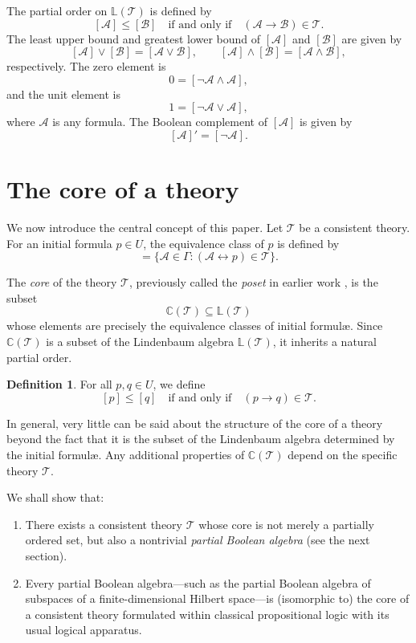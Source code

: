 \documentclass{article}   	%
\theoremstyle{plain}
\theoremstyle{definition}
\newtheorem{definition}[theorem]{Definition}
\theoremstyle{remark}
\begin{document}
The partial order on $\mathbb{L}(\mathcal T)$ is defined by
\[
[\mathcal A] \leq [\mathcal B] \quad \text{if and only if} \quad (\mathcal A \to \mathcal B) \in \mathcal T.
\]
The least upper bound and greatest lower bound of $[\mathcal A]$ and $[\mathcal B]$ are given by
\[
[\mathcal A] \vee [\mathcal B] = [\mathcal A \vee \mathcal B],
\qquad
[\mathcal A] \wedge [\mathcal B] = [\mathcal A \wedge \mathcal B],
\]
respectively.
The zero element is
\[
0 = [\neg \mathcal A \wedge \mathcal A],
\]
and the unit element is
\[
1 = [\neg \mathcal A \vee \mathcal A],
\]
where $\mathcal A$ is any formula.
The Boolean complement of $[\mathcal A]$ is given by
\[
[\mathcal A]' = [\neg \mathcal A].
\]
\section{The core of a theory}
\label{sec:core}

We now introduce the central concept of this paper.
Let $\mathcal T$ be a consistent theory.
For an initial formula $p \in U$, the equivalence class of $p$ is defined by
\begin{equation}
[p] = \{ \mathcal A \in \Gamma : (\mathcal A \leftrightarrow p) \in \mathcal T \}.
\label{eq:core-class}
\end{equation}

The \emph{core} of the theory $\mathcal T$, previously called the \emph{poset} in earlier work \cite{malhas1992quantum}, is the subset
\[
\mathbb C(\mathcal T) \subseteq \mathbb L(\mathcal T)
\]
whose elements are precisely the equivalence classes of initial formul\ae.
Since $\mathbb C(\mathcal T)$ is a subset of the Lindenbaum algebra $\mathbb L(\mathcal T)$, it inherits a natural partial order.

\begin{definition}
\label{def:core-order}
For all $p,q \in U$, we define
\[
[p] \le [q] \quad \text{if and only if} \quad (p \to q) \in \mathcal T.
\]
\end{definition}

In general, very little can be said about the structure of the core of a theory beyond the fact that it is the subset of the Lindenbaum algebra determined by the initial formul\ae.
Any additional properties of $\mathbb C(\mathcal T)$ depend on the specific theory $\mathcal T$.

We shall show that:
\begin{enumerate}
\item[(i)] There exists a consistent theory $\mathcal T$ whose core is not merely a partially ordered set, but also a nontrivial \emph{partial Boolean algebra} (see the next section).
\item[(ii)] Every partial Boolean algebra—such as the partial Boolean algebra of subspaces of a finite-dimensional Hilbert space—is (isomorphic to) the core of a consistent theory formulated within classical propositional logic with its usual logical apparatus.
\end{enumerate}
\end{document}
